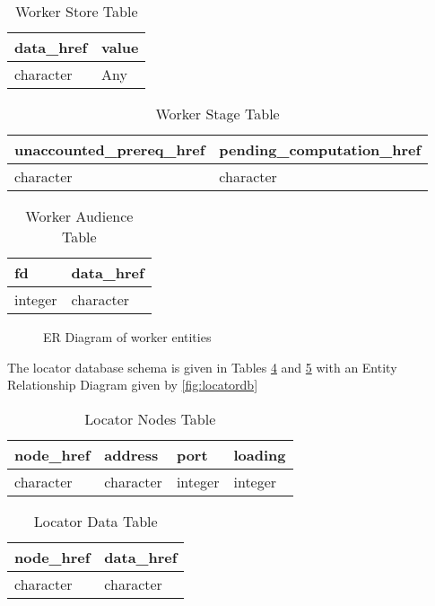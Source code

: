 \begin{table}[]
\caption{Worker Store Table}
\label{tbl:wstore}
\begin{tabular}{@{}ll@{}}
\toprule
data\_href & value \\ \midrule
character  & Any   \\ \bottomrule
\end{tabular}
\end{table}

\begin{table}[]
\caption{Worker Stage Table}
\label{tbl:wstage}
\begin{tabular}{@{}ll@{}}
\toprule
unaccounted\_prereq\_href & pending\_computation\_href \\ \midrule
character                 & character                  \\ \bottomrule
\end{tabular}
\end{table}

\begin{table}[]
\caption{Worker Audience Table}
\label{tbl:waudience}
\begin{tabular}{@{}ll@{}}
\toprule
fd      & data\_href \\ \midrule
integer & character  \\ \bottomrule
\end{tabular}
\end{table}


\begin{figure}

\caption{ER Diagram of worker entities}
\label{fig:workerdb}
\end{figure}

The locator database schema is given in Tables \cref{tbl:lnodes} and \cref{tbl:ldata} with an Entity Relationship Diagram given by \cref{fig:locatordb}


\begin{table}[]
\caption{Locator Nodes Table}
\label{tbl:lnodes}
\begin{tabular}{@{}llll@{}}
\toprule
node\_href & address   & port    & loading \\ \midrule
character  & character & integer & integer \\ \bottomrule
\end{tabular}
\end{table}

\begin{table}[]
\caption{Locator Data Table}
\label{tbl:ldata}
\begin{tabular}{@{}ll@{}}
\toprule
node\_href & data\_href \\ \midrule
character  & character  \\ \bottomrule
\end{tabular}
\end{table}

